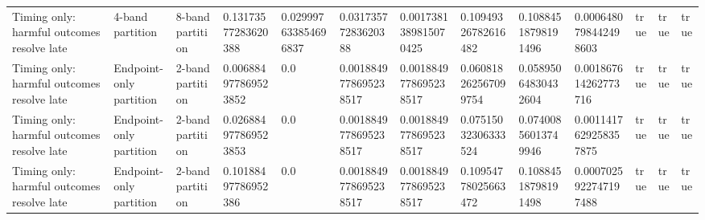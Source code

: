 \begin{tabular}{lllllllllllll}
Timing only: harmful outcomes resolve late & 4-band partition & 8-band partition & 0.13173577283620388 & 0.029997633854696837 & 0.03173577283620388 & 0.0017381389815070425 & 0.10949326782616482 & 0.10884518798191496 & 0.0006480798442498603 & true & true & true \\
Timing only: harmful outcomes resolve late & Endpoint-only partition & 2-band partition & 0.006884977869523852 & 0.0 & 0.0018849778695238517 & 0.0018849778695238517 & 0.060818262567099754 & 0.05895064830432604 & 0.001867614262773716 & true & true & true \\
Timing only: harmful outcomes resolve late & Endpoint-only partition & 2-band partition & 0.026884977869523853 & 0.0 & 0.0018849778695238517 & 0.0018849778695238517 & 0.07515032306333524 & 0.07400856013749946 & 0.0011417629258357875 & true & true & true \\
Timing only: harmful outcomes resolve late & Endpoint-only partition & 2-band partition & 0.10188497786952386 & 0.0 & 0.0018849778695238517 & 0.0018849778695238517 & 0.10954778025663472 & 0.10884518798191498 & 0.0007025922747197488 & true & true & true \\
\bottomrule
\end{tabular}

